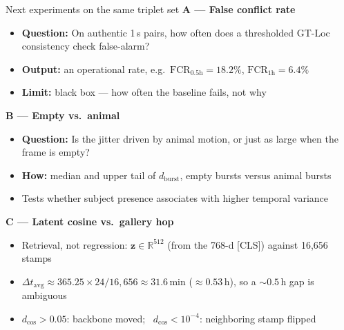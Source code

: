 \documentclass[aspectratio=169,11pt]{beamer}
\begin{document}
\begin{frame}{Next experiments on the same triplet set}
\small\setlength{\parskip}{0pt}
\textbf{A --- False conflict rate}
\begin{itemize}\setlength{\itemsep}{0.04em}
  \item \textbf{Question:} On authentic 1\,s pairs, how often does a thresholded GT-Loc consistency check false-alarm?
  \item \textbf{Output:} an operational rate, e.g.\ $\mathrm{FCR}_{0.5\mathrm{h}}=18.2\%$, $\mathrm{FCR}_{1\mathrm{h}}=6.4\%$
  \item \textbf{Limit:} black box --- how often the baseline fails, not why
\end{itemize}
\vspace{0.12em}
\textbf{B --- Empty vs.\ animal}
\begin{itemize}\setlength{\itemsep}{0.04em}
  \item \textbf{Question:} Is the jitter driven by animal motion, or just as large when the frame is empty?
  \item \textbf{How:} median and upper tail of $d_{\mathrm{burst}}$, empty bursts versus animal bursts
  \item Tests whether subject presence associates with higher temporal variance
\end{itemize}
\vspace{0.12em}
\textbf{C --- Latent cosine vs.\ gallery hop}
\begin{itemize}\setlength{\itemsep}{0.04em}
  \item Retrieval, not regression: $\mathbf{z}\in\mathbb{R}^{512}$ (from the 768-d [CLS]) against 16{,}656 stamps
  \item $\Delta t_{\mathrm{avg}}\approx 365.25\times 24/16{,}656\approx 31.6\,\mathrm{min}$ ($\approx 0.53\,\mathrm{h}$), so a $\sim 0.5\,\mathrm{h}$ gap is ambiguous
  \item $d_{\cos}>0.05$: backbone moved; \ $d_{\cos}<10^{-4}$: neighboring stamp flipped
\end{itemize}
\end{frame}
\end{document}
